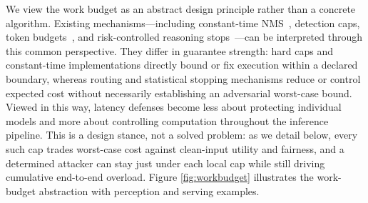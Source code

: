 \documentclass[acmsmall,screen,review,nonacm]{acmart}
\begin{document}
We view the work budget as an abstract design principle rather than a concrete algorithm. Existing mechanisms---including constant-time NMS~\cite{biton2023timing}, detection caps, token budgets~\cite{chen2026tokenbudget}, and risk-controlled reasoning stops~\cite{wang2026conformal}---can be interpreted through this common perspective. They differ in guarantee strength: hard caps and constant-time implementations directly bound or fix execution within a declared boundary, whereas routing and statistical stopping mechanisms reduce or control expected cost without necessarily establishing an adversarial worst-case bound. Viewed in this way, latency defenses become less about protecting individual models and more about controlling computation throughout the inference pipeline. This is a design stance, not a solved problem: as we detail below, every such cap trades worst-case cost against clean-input utility and fairness, and a determined attacker can stay just under each local cap while still driving cumulative end-to-end overload. Figure \ref{fig:workbudget} illustrates the work-budget abstraction with perception and serving examples.


\end{document}
